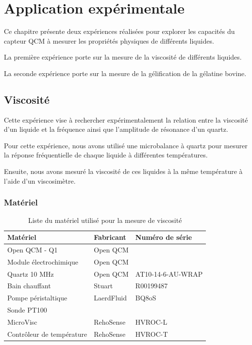 \chapter{Application expérimentale}
\label{chap:application_experimentale}

Ce chapitre présente deux expériences réalisées pour explorer les capacités du capteur QCM à mesurer les propriétés physiques de différents liquides.

La première expérience porte sur la mesure de la viscosité de différents liquides.

La seconde expérience porte sur la mesure de la gélification de la gélatine bovine.


\section{Viscosité}

Cette expérience vise à rechercher expérimentalement la relation entre la viscosité d'un liquide et la fréquence ainsi que l'amplitude de résonance d'un quartz.

Pour cette expérience, nous avons utilisé une microbalance à quartz pour mesurer la réponse fréquentielle de chaque liquide à différentes températures.

Ensuite, nous avons mesuré la viscosité de ces liquides à la même température à l'aide d'un viscosimètre.

\subsection{Matériel}
 
\begin{table}[H]
    \centering
    \begin{tabular}{|l|l|l|}
        \hline
        \textbf{Matériel}         & \textbf{Fabricant}   & \textbf{Numéro de série} \\
        \hline
        Open QCM - Q1            & Open QCM              &   \\
        Module électrochimique   & Open QCM              &   \\
        Quartz 10 MHz            & Open QCM              & AT10-14-6-AU-WRAP  \\
        Bain chauffant          & Stuart                & R00199487 \\
        Pompe péristaltique     & LaerdFluid            & BQ8oS     \\
        Sonde PT100             &                       &   \\
        MicroVisc               & RehoSense             & HVROC-L   \\
        Contrôleur de température & RehoSense           & HVROC-T   \\
        \hline
    \end{tabular}
    \caption{Liste du matériel utilisé pour la mesure de viscosité}
    \label{tab:MatérielViscosité}
\end{table}

